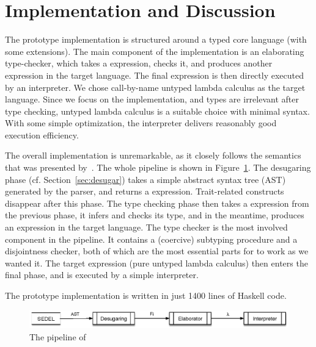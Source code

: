 \section{Implementation and Discussion}

The \name prototype implementation is structured around a typed core language
(\bname with some extensions). The main component of the implementation is an
elaborating type-checker, which takes a \bname expression, checks it, and
produces another expression in the target language. The final expression is then
directly executed by an interpreter. We chose call-by-name untyped lambda
calculus as the target language. Since we focus on the implementation, and types
are irrelevant after type checking, untyped lambda calculus is a suitable choice
with minimal syntax. With some simple optimization, the interpreter delivers
reasonably good execution efficiency.

The overall implementation is unremarkable, as it closely follows the semantics
that was presented by~\citet{alpuimdisjoint}. The whole pipeline is shown in
Figure~\ref{fig:pipeline}. The desugaring phase (cf. Section~\ref{sec:desugar})
takes a simple abstract syntax tree (AST) generated by the parser, and returns a
\bname expression. Trait-related constructs disappear after this phase. The
type checking phase then takes a \bname expression from the previous phase, it
infers and checks its type, and in the meantime, produces an expression in the
target language. The type checker is the most involved component in the
pipeline. It contains a (coercive) subtyping procedure and a disjointness
checker, both of which are the most essential parts for \name to work as we
wanted it. The target expression (pure untyped lambda calculus) then enters the
final phase, and is executed by a simple interpreter.

The prototype implementation is written in just 1400 lines of Haskell code.

\begin{figure}[t]
  \centering
  \includegraphics[scale=0.9]{pipeline.eps}
  \caption{The pipeline of \name}
  \label{fig:pipeline}
\end{figure}